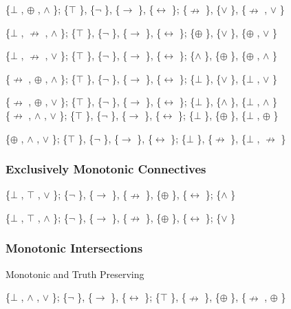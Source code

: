 \{$\bot$ , $\oplus$ , $\land$ \}; \{$\top$ \}, \{$\neg$ \}, \{$\to$ \}, \{$\leftrightarrow$ \}; \{$\nrightarrow$ \}, \{$\lor$ \}, \{$\nrightarrow$ , $\lor$ \}

\{$\bot$ , $\nrightarrow$ , $\land$ \}; \{$\top$ \}, \{$\neg$ \}, \{$\to$ \}, \{$\leftrightarrow$ \}; \{$\oplus$ \}, \{$\lor$ \}, \{$\oplus$ , $\lor$ \}

\{$\bot$ , $\nrightarrow$ , $\lor$ \}; \{$\top$ \}, \{$\neg$ \}, \{$\to$ \}, \{$\leftrightarrow$ \}; \{$\land$ \}, \{$\oplus$ \}, \{$\oplus$ , $\land$ \}

\{$\nrightarrow$ , $\oplus$ , $\land$ \}; \{$\top$ \}, \{$\neg$ \}, \{$\to$ \}, \{$\leftrightarrow$ \}; \{$\bot$ \}, \{$\lor$ \}, \{$\bot$ , $\lor$ \}

\{$\nrightarrow$ , $\oplus$ , $\lor$ \}; \{$\top$ \}, \{$\neg$ \}, \{$\to$ \}, \{$\leftrightarrow$ \}; \{$\bot$ \}, \{$\land$ \}, \{$\bot$ , $\land$ \}\\
\{$\nrightarrow$ , $\land$ , $\lor$ \}; \{$\top$ \}, \{$\neg$ \}, \{$\to$ \}, \{$\leftrightarrow$ \}; \{$\bot$ \}, \{$\oplus$ \}, \{$\bot$ , $\oplus$ \}

\{$\oplus$ , $\land$ , $\lor$ \}; \{$\top$ \}, \{$\neg$ \}, \{$\to$ \}, \{$\leftrightarrow$ \}; \{$\bot$ \}, \{$\nrightarrow$ \}, \{$\bot$ , $\nrightarrow$ \}

\hypertarget{exclusively-monotonic-connectives}{%
\subsubsection{\texorpdfstring{Exclusively Monotonic Connectives
}{Exclusively Monotonic Connectives }}\label{exclusively-monotonic-connectives}}

\{$\bot$ , $\top$ , $\lor$ \}; \{$\neg$ \}, \{$\to$ \}, \{$\nrightarrow$ \}, \{$\oplus$ \}, \{$\leftrightarrow$ \}; \{$\land$ \}

\{$\bot$ , $\top$ , $\land$ \}; \{$\neg$ \}, \{$\to$ \}, \{$\nrightarrow$ \}, \{$\oplus$ \}, \{$\leftrightarrow$ \}; \{$\lor$ \}

\hypertarget{monotonic-intersections}{%
\subsubsection{Monotonic Intersections}\label{monotonic-intersections}}

Monotonic and Truth Preserving

\{$\bot$ , $\land$ , $\lor$ \}; \{$\neg$ \}, \{$\to$ \}, \{$\leftrightarrow$ \}; \{$\top$ \}, \{$\nrightarrow$ \}, \{$\oplus$ \}, \{$\nrightarrow$ , $\oplus$ \}

